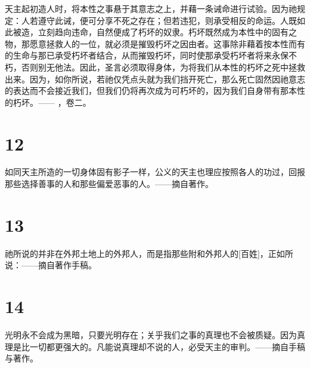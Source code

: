 天主起初造人时，将本性之事悬于其意志之上，并藉一条诫命进行试验。因为祂规定：人若遵守此诫，便可分享不死之存在；但若违犯，则承受相反的命运。人既如此被造，立刻趋向违命，自然便成了朽坏的奴隶。朽坏既然成为本性中的固有之物，那愿意拯救人的一位，就必须是摧毁朽坏之因由者。这事除非藉着按本性而有的生命与那已承受朽坏者结合，从而摧毁朽坏，同时使那承受朽坏者将来永保不朽，否则别无他法。因此，圣言必须取得身体，为将我们从本性的朽坏之死中拯救出来。因为，如你所说，若祂仅凭点头就为我们挡开死亡，那么死亡固然因祂意志的表达而不会接近我们，但我们仍将再次成为可朽坏的，因为我们自身带有那本性的朽坏。—— ，卷二。\par


\section{12}

如同天主所造的一切身体固有影子一样，公义的天主也理应按照各人的功过，回报那些选择善事的人和那些偏爱恶事的人。——摘自著作。\par


\section{13}

祂所说的并非在外邦土地上的外邦人，而是指那些附和外邦人的[百姓]，正如所说：——摘自著作手稿。\par


\section{14}

光明永不会成为黑暗，只要光明存在；关乎我们之事的真理也不会被质疑。因为真理是比一切都更强大的。凡能说真理却不说的人，必受天主的审判。——摘自手稿与著作。\par


